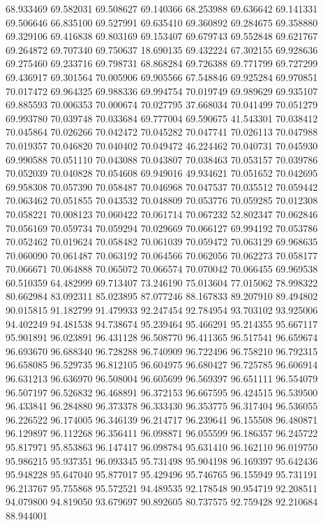 68.933469
69.582031
69.508627
69.140366
68.253988
69.636642
69.141331
69.506646
66.835100
69.527991
69.635410
69.360892
69.284675
69.358880
69.329106
69.416838
69.803169
69.153407
69.679743
69.552848
69.621767
69.264872
69.707340
69.750637
18.690135
69.432224
67.302155
69.928636
69.275460
69.233716
69.798731
68.868284
69.726388
69.771799
69.727299
69.436917
69.301564
70.005906
69.905566
67.548846
69.925284
69.970851
70.017472
69.964325
69.988336
69.994754
70.019749
69.989629
69.935107
69.885593
70.006353
70.000674
70.027795
37.668034
70.041499
70.051279
69.993780
70.039748
70.033684
69.777004
69.590675
41.543301
70.038412
70.045864
70.026266
70.042472
70.045282
70.047741
70.026113
70.047988
70.019357
70.046820
70.040402
70.049472
46.224462
70.040731
70.045930
69.990588
70.051110
70.043088
70.043807
70.038463
70.053157
70.039786
70.052039
70.040828
70.054608
69.949016
49.934621
70.051652
70.042695
69.958308
70.057390
70.058487
70.046968
70.047537
70.035512
70.059442
70.063462
70.051855
70.043532
70.048809
70.053776
70.059285
70.012308
70.058221
70.008123
70.060422
70.061714
70.067232
52.802347
70.062846
70.056169
70.059734
70.059294
70.029669
70.066127
69.994192
70.053786
70.052462
70.019624
70.058482
70.061039
70.059472
70.063129
69.968635
70.060090
70.061487
70.063192
70.064566
70.062056
70.062273
70.058177
70.066671
70.064888
70.065072
70.066574
70.070042
70.066455
69.969538
60.510359
64.482999
69.713407
73.246190
75.013604
77.015062
78.998322
80.662984
83.092311
85.023895
87.077246
88.167833
89.207910
89.494802
90.015815
91.182799
91.479933
92.247454
92.784954
93.703102
93.925006
94.402249
94.481538
94.738674
95.239464
95.466291
95.214355
95.667117
95.901891
96.023891
96.431128
96.508770
96.411365
96.517541
96.659674
96.693670
96.688340
96.728288
96.740909
96.722496
96.758210
96.792315
96.658085
96.529735
96.812105
96.604975
96.680427
96.725785
96.606914
96.631213
96.636970
96.508004
96.605699
96.569397
96.651111
96.554079
96.507197
96.526832
96.468891
96.372153
96.667595
96.424515
96.539500
96.433841
96.284880
96.373378
96.333430
96.353775
96.317404
96.536055
96.226522
96.174005
96.346139
96.214717
96.239641
96.155508
96.480871
96.129897
96.112268
96.356411
96.098871
96.055599
96.186357
96.245722
95.817971
95.853863
96.147417
96.098784
95.631410
96.162110
96.019750
95.986215
95.937351
96.093345
95.731498
95.904198
96.169397
95.642436
95.948228
95.647040
95.877017
95.429496
95.746765
96.155949
95.731191
96.213767
95.755868
95.572521
94.489535
92.178548
90.954719
92.208511
94.079800
94.819050
93.679697
90.892605
80.737575
92.759428
92.210684
88.944001
